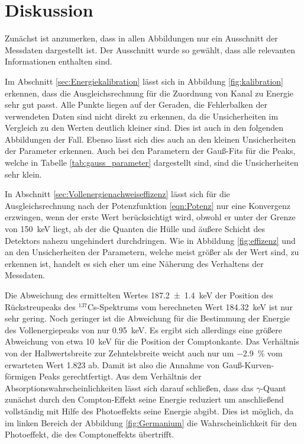 \section{Diskussion}
\label{sec:Diskussion}
Zunächst ist anzumerken, dass in allen Abbildungen nur ein Ausschnitt
der Messdaten dargestellt ist. Der Ausschnitt wurde so gewählt, dass alle
relevanten Informationen enthalten sind.

Im Abschnitt \ref{sec:Energiekalibration} lässt sich in Abbildung \ref{fig:kalibration}
erkennen, dass die Ausgleichsrechnung für die Zuordnung von Kanal zu Energie
sehr gut passt. Alle Punkte liegen auf der Geraden, die Fehlerbalken der
verwendeten Daten sind nicht direkt zu erkennen, da die Unsicherheiten im Vergleich zu
den Werten deutlich kleiner sind. Dies ist auch in den folgenden Abbildungen
der Fall. Ebenso lässt sich dies auch an den kleinen Unsicherheiten der Parameter erkennen.
Auch bei den Parametern der Gauß-Fits für die Peaks, welche in Tabelle
\ref{tab:gauss_parameter} dargestellt sind, sind die Unsicherheiten sehr klein.

In Abschnitt \ref{sec:Vollenergienachweiseffizenz} lässt sich für die Ausgleichsrechnung nach
der Potenzfunktion \ref{eqn:Potenz} nur eine Konvergenz erzwingen, wenn der erste Wert
berücksichtigt wird, obwohl er unter der Grenze von \SI{150}{\kilo\electronvolt}
liegt, ab der die Quanten die Hülle und äußere Schicht des Detektors nahezu ungehindert 
durchdringen. Wie in Abbildung \ref{fig:effizenz} und an den Unsicherheiten der 
Parametern, welche meist größer als der Wert sind, zu erkennen ist, handelt es sich
eher um eine Näherung des Verhaltens der Messdaten.

Die Abweichung des ermittelten Wertes \SI{187.2(14)}{\kilo\electronvolt} der
Position des Rückstreupeaks des ${}^{137}$Cs-Spektrums vom
berechneten Wert \SI{184.32}{\kilo\electronvolt} ist nur sehr gering. Noch
geringer ist die Abweichung für die Bestimmung der Energie des Vollenergiepeaks
von nur \SI{0.95}{\kilo\electronvolt}. Es ergibt sich allerdings eine
größere Abweichung von etwa \SI{10}{\kilo\electronvolt} für die Position
der Comptonkante.
Das Verhältnis von der Halbwertsbreite zur Zehntelsbreite weicht auch nur 
um \SI{-2.9}{\percent} vom erwarteten Wert \num{1.823} ab. Damit ist
also die Annahme von Gauß-Kurven-förmigen Peaks gerechtfertigt.
Aus dem Verhältnis der Absorptionswahrscheinlichkeiten lässt sich darauf schließen,
dass das $\gamma$-Quant zunächst durch den Compton-Effekt seine Energie reduziert
um anschließend vollständig mit Hilfe des Photoeffekts seine Energie abgibt.
Dies ist möglich, da im linken Bereich der Abbildung \ref{fig:Germanium}
die Wahrscheinlichkeit für den Photoeffekt, die des Comptoneffekts
übertrifft.

